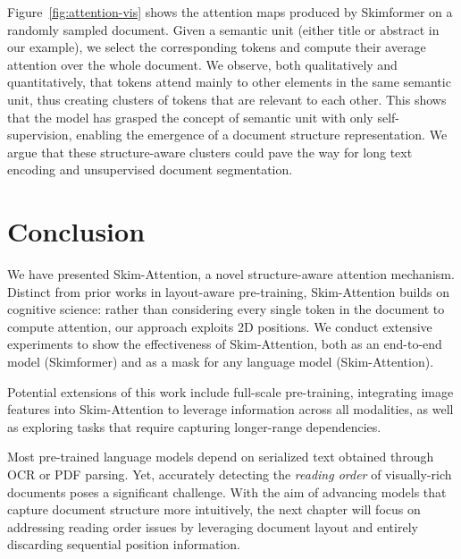 Figure~\ref{fig:attention-vis} shows the attention maps produced by Skimformer on a randomly sampled document. Given a semantic unit (either title or abstract in our example), we select the corresponding tokens and compute their average attention over the whole document. We observe, both qualitatively and quantitatively, that tokens attend mainly to other elements in the same semantic unit, thus creating clusters of tokens that are relevant to each other. This shows that the model has grasped the concept of semantic unit with only self-supervision, enabling the emergence of a document structure representation. We argue that these structure-aware clusters could pave the way for long text encoding and unsupervised document segmentation.

\section{Conclusion}

We have presented Skim-Attention, a novel structure-aware attention mechanism. Distinct from prior works in layout-aware pre-training, Skim-Attention builds on cognitive science: rather than considering every single token in the document to compute attention, our approach exploits 2D positions. We conduct extensive experiments to show the effectiveness of Skim-Attention, both as an end-to-end model (Skimformer) and as a mask for any language model (Skim-Attention). 

Potential extensions of this work include full-scale pre-training, integrating image features into Skim-Attention to leverage information across all modalities, as well as exploring tasks that require capturing longer-range dependencies.

Most pre-trained language models depend on serialized text obtained through \ac{OCR} or PDF parsing. Yet, accurately detecting the \textit{reading order} of visually-rich documents poses a significant challenge. With the aim of advancing models that capture document structure more intuitively, the next chapter will focus on addressing reading order issues by leveraging document layout and entirely discarding sequential position information.


